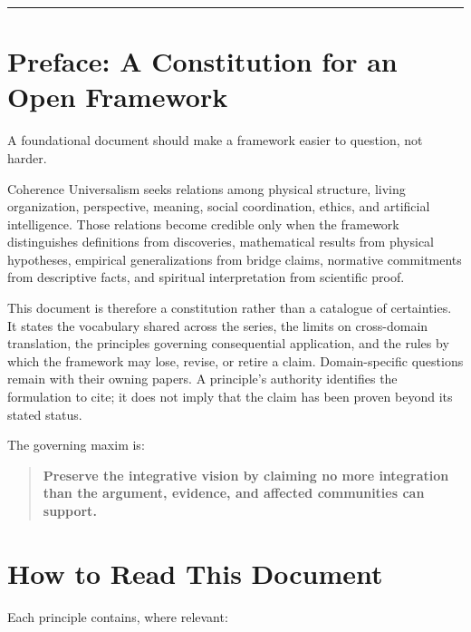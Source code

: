 \documentclass[
  11pt,
]{article}
\begin{document}
\begin{center}\rule{0.5\linewidth}{0.5pt}\end{center}

\section{Preface: A Constitution for an Open
Framework}\label{preface-a-constitution-for-an-open-framework}

A foundational document should make a framework easier to question, not
harder.

Coherence Universalism seeks relations among physical structure, living
organization, perspective, meaning, social coordination, ethics, and
artificial intelligence. Those relations become credible only when the
framework distinguishes definitions from discoveries, mathematical
results from physical hypotheses, empirical generalizations from bridge
claims, normative commitments from descriptive facts, and spiritual
interpretation from scientific proof.

This document is therefore a constitution rather than a catalogue of
certainties. It states the vocabulary shared across the series, the
limits on cross-domain translation, the principles governing
consequential application, and the rules by which the framework may
lose, revise, or retire a claim. Domain-specific questions remain with
their owning papers. A principle's authority identifies the formulation
to cite; it does not imply that the claim has been proven beyond its
stated status.

The governing maxim is:

\begin{quote}
\textbf{Preserve the integrative vision by claiming no more integration
than the argument, evidence, and affected communities can support.}
\end{quote}

\section{How to Read This Document}\label{how-to-read-this-document}

Each principle contains, where relevant:
\end{document}
